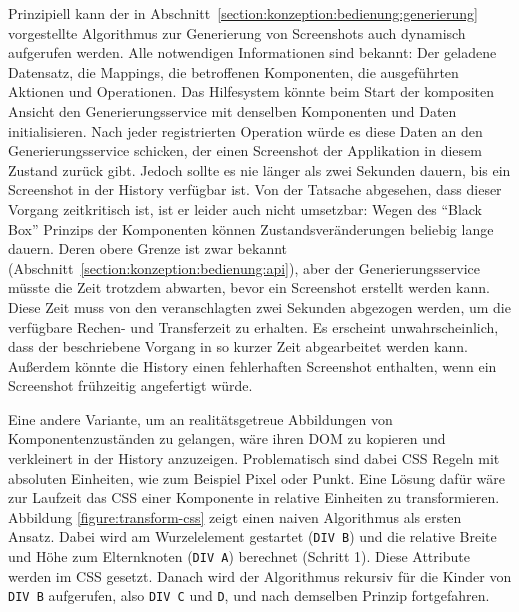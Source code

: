 \documentclass[
	headsepline,
	footsepline,
	fontsize=12pt,
	bibliography=totoc
]{scrbook}
\begin{document}

Prinzipiell kann der in Abschnitt~\ref{section:konzeption:bedienung:generierung} vorgestellte Algorithmus zur Generierung von Screenshots auch dynamisch aufgerufen werden. Alle notwendigen Informationen sind bekannt: Der geladene Datensatz, die Mappings, die betroffenen Komponenten, die ausgeführten Aktionen und Operationen. Das Hilfesystem könnte beim Start der kompositen Ansicht den Generierungsservice mit denselben Komponenten und Daten initialisieren. Nach jeder registrierten Operation würde es diese Daten an den Generierungsservice schicken, der einen Screenshot der Applikation in diesem Zustand zurück gibt. Jedoch sollte es nie länger als zwei Sekunden dauern, bis ein Screenshot in der History verfügbar ist. Von der Tatsache abgesehen, dass dieser Vorgang zeitkritisch ist, ist er leider auch nicht umsetzbar: Wegen des \enquote{Black Box} Prinzips der Komponenten können Zustandsveränderungen beliebig lange dauern. Deren obere Grenze ist zwar bekannt (Abschnitt~\ref{section:konzeption:bedienung:api}), aber der Generierungsservice müsste die Zeit trotzdem abwarten, bevor ein Screenshot erstellt werden kann. Diese Zeit muss von den veranschlagten zwei Sekunden abgezogen werden, um die verfügbare Rechen- und Transferzeit zu erhalten. Es erscheint unwahrscheinlich, dass der beschriebene Vorgang in so kurzer Zeit abgearbeitet werden kann. Außerdem könnte die History einen fehlerhaften Screenshot enthalten, wenn ein Screenshot frühzeitig angefertigt würde.


Eine andere Variante, um an realitätsgetreue Abbildungen von Komponentenzuständen zu gelangen, wäre ihren DOM zu kopieren und verkleinert in der History anzuzeigen. Problematisch sind dabei CSS Regeln mit absoluten Einheiten, wie zum Beispiel Pixel oder Punkt. Eine Lösung dafür wäre zur Laufzeit das CSS einer Komponente in relative Einheiten zu transformieren. Abbildung \ref{figure:transform-css} zeigt  einen naiven Algorithmus als ersten Ansatz. Dabei wird am Wurzelelement gestartet (\texttt{DIV B}) und die relative Breite und Höhe zum Elternknoten (\texttt{DIV A}) berechnet (Schritt 1). Diese Attribute werden im CSS gesetzt. Danach wird der Algorithmus rekursiv für die Kinder von \texttt{DIV B} aufgerufen, also \texttt{DIV C} und \texttt{D}, und nach demselben Prinzip fortgefahren.
\end{document}
